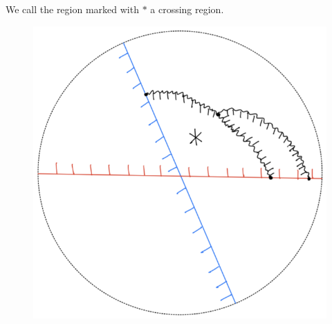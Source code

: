 \begin{definition}
\begin{enumerate}[label = (\roman*)]
\begin{itemize}
\begin{figure}[H]
    \caption{}
    \label{fig:your-label}
\end{figure}
We call the region marked with $*$ a crossing region.
\begin{figure}[H] 
    \centering
    \includegraphics[scale = 0.95]{diagrams/local_systems_on_as_diagrams/8.png} 
    \caption{}
    \label{fig:your-label}
\end{figure}
\end{itemize}


\end{enumerate}
\end{definition}
